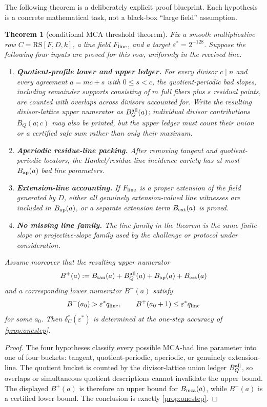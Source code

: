 \documentclass[11pt]{article}
\newtheorem{theorem}{Theorem}[section]
\theoremstyle{definition}
\theoremstyle{remark}
\newcommand{\RS}{\mathrm{RS}}
\begin{document}
The following theorem is a deliberately explicit proof blueprint.  Each
hypothesis is a concrete mathematical task, not a black-box ``large field''
assumption.

\begin{theorem}[conditional MCA threshold theorem]\label{thm:conditional-mca}
Fix a smooth multiplicative row $C=\RS[F,D,k]$, a line field $F_{\rm line}$, and
a target $\varepsilon^*=2^{-128}$.  Suppose the following four inputs are proved
for this row, uniformly in the received line:
\begin{enumerate}[label=(\roman*),leftmargin=2.2em]
\item \textbf{Quotient-profile lower and upper ledger.}  For every divisor
$c\mid n$ and every agreement $a=mc+s$ with $0\le s<c$, the quotient-periodic
bad slopes, including remainder supports consisting of $m$ full fibers plus
$s$ residual points, are counted with overlaps across divisors accounted for.
Write the resulting divisor-lattice upper numerator as $B_Q^{\rm all}(a)$;
individual divisor contributions $B_Q(a;c)$ may also be printed, but the upper
ledger must count their union or a certified safe sum rather than only their
maximum.
\item \textbf{Aperiodic residue-line packing.}  After removing tangent and
quotient-periodic locators, the Hankel/residue-line incidence variety has at
most $B_{\rm ap}(a)$ bad line parameters.
\item \textbf{Extension-line accounting.}  If $F_{\rm line}$ is a proper
extension of the field generated by $D$, either all genuinely extension-valued
line witnesses are included in $B_{\rm ap}(a)$, or a separate extension term
$B_{\rm ext}(a)$ is proved.
\item \textbf{No missing line family.}  The line family in the theorem is the
same finite-slope or projective-slope family used by the challenge or protocol
under consideration.
\end{enumerate}
Assume moreover that the resulting upper numerator
\[
        B^+(a):=B_{\rm tan}(a)+B_Q^{\rm all}(a)
                +B_{\rm ap}(a)+B_{\rm ext}(a)
\]
and a corresponding lower numerator $B^-(a)$ satisfy
\[
        B^-(a_0)>\varepsilon^* q_{\rm line},
        \qquad
        B^+(a_0+1)\le\varepsilon^* q_{\rm line}
\]
for some $a_0$.  Then $\delta_C^*(\varepsilon^*)$ is determined at the
one-step accuracy of \cref{prop:onestep}.
\end{theorem}

\begin{proof}
The four hypotheses classify every possible MCA-bad line parameter into one of
four buckets: tangent, quotient-periodic, aperiodic, or genuinely extension-line.
The quotient bucket is counted by the divisor-lattice union ledger $B_Q^{\rm all}$,
so overlaps or simultaneous quotient descriptions cannot invalidate the upper
bound.  The displayed $B^+(a)$ is therefore an upper bound for $B_{\rm mca}(a)$, while
$B^-(a)$ is a certified lower bound.  The conclusion is exactly
\cref{prop:onestep}.
\end{proof}
\end{document}
